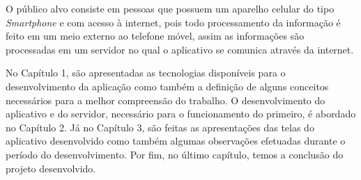 
O público alvo consiste em pessoas que possuem um aparelho celular do tipo \textit{Smartphone} e com acesso à internet, pois todo processamento da informação é feito em um meio externo ao telefone móvel, assim as informações são processadas em um servidor no qual o aplicativo se comunica através da internet.

No Capítulo 1, são apresentadas as tecnologias disponíveis para o desenvolvimento da aplicação como também a definição de alguns conceitos necessários para a melhor compreensão do trabalho. O desenvolvimento do aplicativo e do servidor, necessário para o funcionamento do primeiro, é abordado no Capítulo 2. Já no Capítulo 3, são feitas as apresentações das telas do aplicativo desenvolvido como também algumas observações efetuadas durante o período do desenvolvimento. Por fim, no último capítulo, temos a conclusão do projeto desenvolvido.
